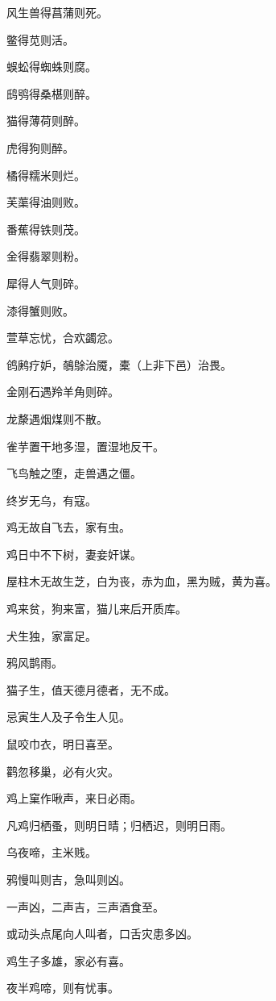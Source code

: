 \documentclass[a4paper,12pt,UTF8,twoside]{ctexbook}
\begin{document}
    风生兽得菖蒲则死。
    
    鳖得苋则活。
    
    蜈蚣得蜘蛛则腐。
    
    鸱鸮得桑椹则醉。
    
    猫得薄荷则醉。
    
    虎得狗则醉。
    
    橘得糯米则烂。
    
    芙蕖得油则败。
    
    番蕉得铁则茂。
    
    金得翡翠则粉。
    
    犀得人气则碎。
    
    漆得蟹则败。
    
    萱草忘忧，合欢蠲忿。
    
    鸧鹒疗妒，鵸鵌治魇，橐（上非下邑）治畏。
    
    金刚石遇羚羊角则碎。
    
    龙漦遇烟煤则不散。
    
    雀芋置干地多湿，置湿地反干。
    
    飞鸟触之堕，走兽遇之僵。
    
    终岁无乌，有寇。
    
    鸡无故自飞去，家有虫。
    
    鸡日中不下树，妻妾奸谋。
    
    屋柱木无故生芝，白为丧，赤为血，黑为贼，黄为喜。
    
    鸡来贫，狗来富，猫儿来后开质库。
    
    犬生独，家富足。
    
    鸦风鹊雨。
    
    猫子生，值天德月德者，无不成。
    
    忌寅生人及子令生人见。
    
    鼠咬巾衣，明日喜至。
    
    鹳忽移巢，必有火灾。
    
    鸡上窠作啾声，来日必雨。
    
    凡鸡归栖蚤，则明日晴；归栖迟，则明日雨。
    
    乌夜啼，主米贱。
    
    鸦慢叫则吉，急叫则凶。
    
    一声凶，二声吉，三声酒食至。
    
    或动头点尾向人叫者，口舌灾患多凶。
    
    鸡生子多雄，家必有喜。
    
    夜半鸡啼，则有忧事。
    
\end{document}

